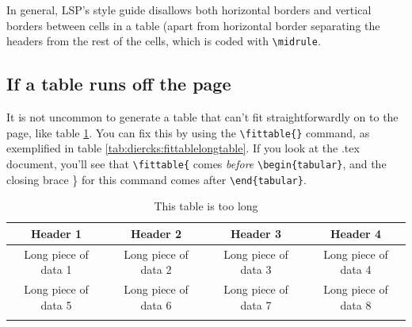 \documentclass[output=paper,colorlinks,citecolor=brown,
]{langscibook}
\begin{document}
In general, LSP's style guide disallows both horizontal borders and vertical borders between cells in a table (apart from horizontal border separating the headers from the rest of the cells, which is coded with \verb|\midrule|.

\subsection{If a table runs off the page}

It is not uncommon to generate a table that can't fit straightforwardly on to the page, like table \ref{tab:diercks:toolongtable}. You can fix this by using the \verb|\fittable{}| command, as exemplified in table \ref{tab:diercks:fittablelongtable}. If you look at the .tex document, you'll see that \verb|\fittable{| comes \textit{before} \verb|\begin{tabular}|, and the closing brace \} for this command comes after \verb|\end{tabular}|.


\begin{table}
  \caption{This table is too long}
  \label{tab:diercks:toolongtable}
\begin{tabular}{cccc}
\lsptoprule %
Header 1 & Header 2 & Header 3 & Header 4\\
\midrule\midrule
Long piece of data 1 & Long piece of data 2 & Long piece of data 3 & Long piece of data 4  \\
Long piece of data 5 & Long piece of data 6 & Long piece of data 7 & Long piece of data 8 \\
\lspbottomrule %
\end{tabular}
\end{table}

\begin{table}
  \caption{Long table with the \backslash fittable command}
  \label{tab:diercks:fittablelongtable}
\end{table}
\end{document}
